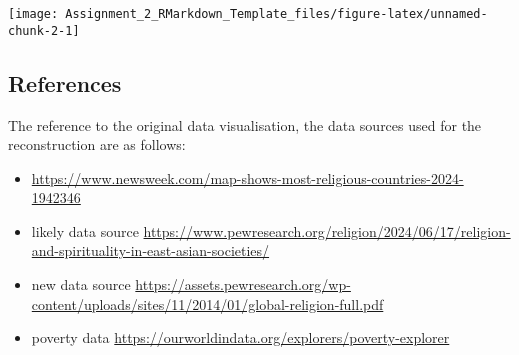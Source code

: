 \documentclass[
]{article}
\providecommand{\tightlist}{%
  \setlength{\itemsep}{0pt}\setlength{\parskip}{0pt}}
\begin{document}
\begin{center}\texttt{[image: Assignment\_2\_RMarkdown\_Template\_files/figure-latex/unnamed-chunk-2-1]} \end{center}

\subsection{References}\label{references}

The reference to the original data visualisation, the data sources used
for the reconstruction are as follows:

\begin{itemize}
\tightlist
\item
  \url{https://www.newsweek.com/map-shows-most-religious-countries-2024-1942346}
\item
  likely data source
  \url{https://www.pewresearch.org/religion/2024/06/17/religion-and-spirituality-in-east-asian-societies/}
\item
  new data source
  \url{https://assets.pewresearch.org/wp-content/uploads/sites/11/2014/01/global-religion-full.pdf}
\item
  poverty data
  \url{https://ourworldindata.org/explorers/poverty-explorer}
\end{itemize}
\end{document}
